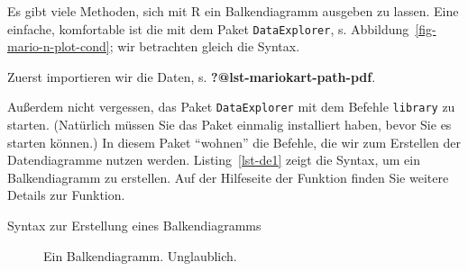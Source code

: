 \documentclass[
  letterpaper,
]{scrbook}
\newenvironment{Shaded}{\begin{snugshade}}{\end{snugshade}}
\newcommand{\FunctionTok}[1]{\textcolor[rgb]{0.28,0.35,0.67}{#1}}
\newcommand{\NormalTok}[1]{\textcolor[rgb]{0.00,0.23,0.31}{#1}}
\newcommand{\OtherTok}[1]{\textcolor[rgb]{0.00,0.23,0.31}{#1}}
\newcommand{\SpecialCharTok}[1]{\textcolor[rgb]{0.37,0.37,0.37}{#1}}
\theoremstyle{definition}
\theoremstyle{definition}
\theoremstyle{definition}
\theoremstyle{remark}
\begin{document}
Es gibt viele Methoden, sich mit R ein Balkendiagramm ausgeben zu
lassen. Eine einfache, komfortable ist die mit dem Paket
\texttt{DataExplorer}, s. Abbildung~\ref{fig-mario-n-plot-cond}; wir
betrachten gleich die Syntax.

Zuerst importieren wir die Daten, s. \textbf{?@lst-mariokart-path-pdf}.

Außerdem nicht vergessen, das Paket \texttt{DataExplorer} mit dem
Befehle \texttt{library} zu starten. (Natürlich müssen Sie das Paket
einmalig installiert haben, bevor Sie es starten können.) In diesem
Paket ``wohnen'' die Befehle, die wir zum Erstellen der Datendiagramme
nutzen werden. Listing~\ref{lst-de1} zeigt die Syntax, um ein
Balkendiagramm zu erstellen. Auf der Hilfeseite der Funktion finden Sie
weitere Details zur Funktion.

\begin{codelisting}

\caption{\label{lst-de1}Syntax zur Erstellung eines Balkendiagramms}

\centering{

\begin{Shaded}
\begin{Highlighting}[]
\FunctionTok{library}\NormalTok{(DataExplorer)}
\NormalTok{mariokart }\OtherTok{\textless{}{-}} \FunctionTok{read.csv}\NormalTok{(mariokart\_path)}

\NormalTok{mariokart }\SpecialCharTok{\%\textgreater{}\%} 
  \FunctionTok{select}\NormalTok{(cond) }\SpecialCharTok{\%\textgreater{}\%} 
  \FunctionTok{plot\_bar}\NormalTok{()}
\end{Highlighting}
\end{Shaded}

}

\end{codelisting}%

\begin{figure}[H]


\caption{\label{fig-de1}Ein Balkendiagramm. Unglaublich.}

\end{figure}%
\end{document}
